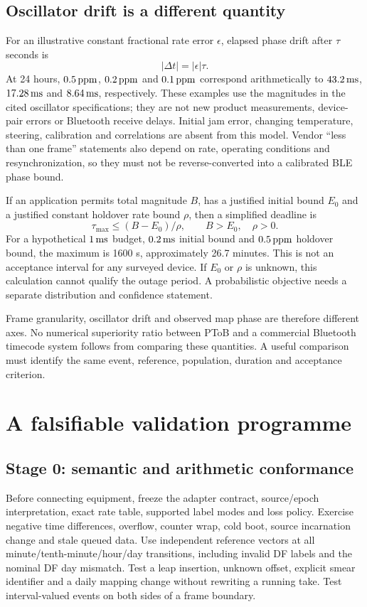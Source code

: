 \documentclass[11pt,letterpaper]{article}
\begin{document}
\subsection{Oscillator drift is a different quantity}
For an illustrative constant fractional rate error $\epsilon$, elapsed phase drift after $\tau$ seconds is
\begin{equation}
 |\Delta t|=|\epsilon|\tau.\label{eq:drift}
\end{equation}
At 24 hours, $0.5\,\mathrm{ppm}$, $0.2\,\mathrm{ppm}$ and $0.1\,\mathrm{ppm}$ correspond arithmetically to $43.2\,\mathrm{ms}$, $17.28\,\mathrm{ms}$ and $8.64\,\mathrm{ms}$, respectively. These examples use the magnitudes in the cited oscillator specifications; they are not new product measurements, device-pair errors or Bluetooth receive delays. Initial jam error, changing temperature, steering, calibration and correlations are absent from this model. Vendor ``less than one frame'' statements also depend on rate, operating conditions and resynchronization, so they must not be reverse-converted into a calibrated BLE phase bound.

If an application permits total magnitude $B$, has a justified initial bound $E_0$ and a justified constant holdover rate bound $\rho$, then a simplified deadline is
\begin{equation}
 \tau_{\max}\leq (B-E_0)/\rho,\qquad B>E_0,\quad\rho>0.\label{eq:hold}
\end{equation}
For a hypothetical $1\,\mathrm{ms}$ budget, $0.2\,\mathrm{ms}$ initial bound and $0.5\,\mathrm{ppm}$ holdover bound, the maximum is 1600 s, approximately 26.7 minutes. This is not an acceptance interval for any surveyed device. If $E_0$ or $\rho$ is unknown, this calculation cannot qualify the outage period. A probabilistic objective needs a separate distribution and confidence statement.

Frame granularity, oscillator drift and observed map phase are therefore different axes. No numerical superiority ratio between PToB and a commercial Bluetooth timecode system follows from comparing these quantities. A useful comparison must identify the same event, reference, population, duration and acceptance criterion.

\section{A falsifiable validation programme}\label{sec:validation}
\subsection{Stage 0: semantic and arithmetic conformance}
Before connecting equipment, freeze the adapter contract, source/epoch interpretation, exact rate table, supported label modes and loss policy. Exercise negative time differences, overflow, counter wrap, cold boot, source incarnation change and stale queued data. Use independent reference vectors at all minute/tenth-minute/hour/day transitions, including invalid DF labels and the nominal DF day mismatch. Test a leap insertion, unknown offset, explicit smear identifier and a daily mapping change without rewriting a running take. Test interval-valued events on both sides of a frame boundary.
\end{document}
